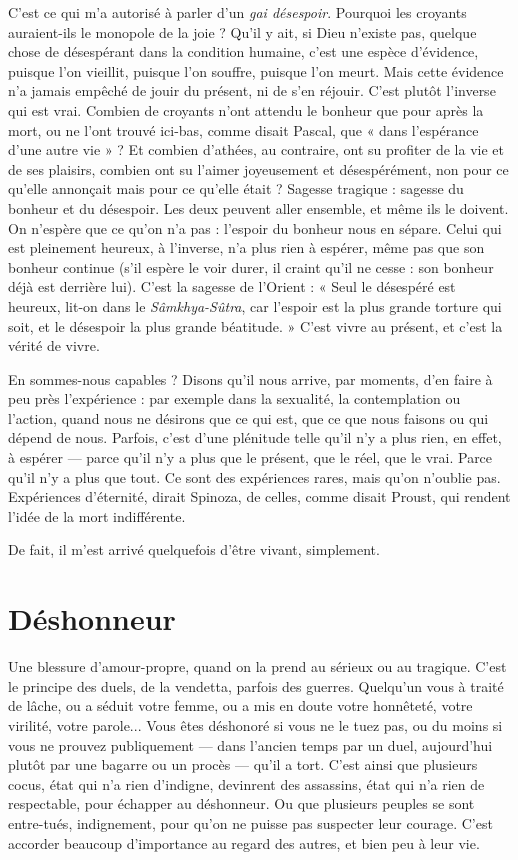 C’est ce qui m’a autorisé à parler d’un {\it gai désespoir}. Pourquoi les croyants
auraient-ils le monopole de la joie ? Qu'il y ait, si Dieu n’existe pas, quelque
chose de désespérant dans la condition humaine, c’est une espèce d’évidence,
puisque l’on vieillit, puisque l’on souffre, puisque l’on meurt. Mais cette évidence
n’a jamais empêché de jouir du présent, ni de s’en réjouir. C’est plutôt
l'inverse qui est vrai. Combien de croyants n’ont attendu le bonheur que pour
après la mort, ou ne l’ont trouvé ici-bas, comme disait Pascal, que « dans l’espérance
d’une autre vie » ? Et combien d’athées, au contraire, ont su profiter de
la vie et de ses plaisirs, combien ont su l’aimer joyeusement et désespérément,
non pour ce qu’elle annonçait mais pour ce qu’elle était ? Sagesse tragique :
sagesse du bonheur et du désespoir. Les deux peuvent aller ensemble, et même
ils le doivent. On n’espère que ce qu’on n’a pas : l'espoir du bonheur nous en
sépare. Celui qui est pleinement heureux, à l’inverse, n’a plus rien à espérer,
même pas que son bonheur continue (s’il espère le voir durer, il craint qu’il ne
cesse : son bonheur déjà est derrière lui). C’est la sagesse de l'Orient : « Seul le
désespéré est heureux, lit-on dans le {\it Sâmkhya-Sûtra}, car l'espoir est la plus
grande torture qui soit, et le désespoir la plus grande béatitude. » C’est vivre au
présent, et c’est la vérité de vivre.

En sommes-nous capables ? Disons qu’il nous arrive, par moments, d’en
faire à peu près l’expérience : par exemple dans la sexualité, la contemplation
ou l’action, quand nous ne désirons que ce qui est, que ce que nous faisons ou
qui dépend de nous. Parfois, c’est d’une plénitude telle qu’il n’y a plus rien, en
effet, à espérer — parce qu’il n’y a plus que le présent, que le réel, que le vrai.
Parce qu’il n’y a plus que tout. Ce sont des expériences rares, mais qu’on
n'oublie pas. Expériences d’éternité, dirait Spinoza, de celles, comme disait
Proust, qui rendent l’idée de la mort indifférente.

De fait, il m'est arrivé quelquefois d’être vivant, simplement.

\section{Déshonneur}
Une blessure d’amour-propre, quand on la prend au sérieux
ou au tragique. C’est le principe des duels, de la vendetta,
parfois des guerres. Quelqu'un vous à traité de lâche, ou a séduit votre femme,
ou a mis en doute votre honnêteté, votre virilité, votre parole... Vous êtes
déshonoré si vous ne le tuez pas, ou du moins si vous ne prouvez publiquement
— dans l’ancien temps par un duel, aujourd’hui plutôt par une bagarre ou un
procès — qu’il a tort. C’est ainsi que plusieurs cocus, état qui n’a rien d’indigne,
devinrent des assassins, état qui n’a rien de respectable, pour échapper au
déshonneur. Ou que plusieurs peuples se sont entre-tués, indignement, pour
qu'on ne puisse pas suspecter leur courage. C’est accorder beaucoup d’importance
au regard des autres, et bien peu à leur vie.

